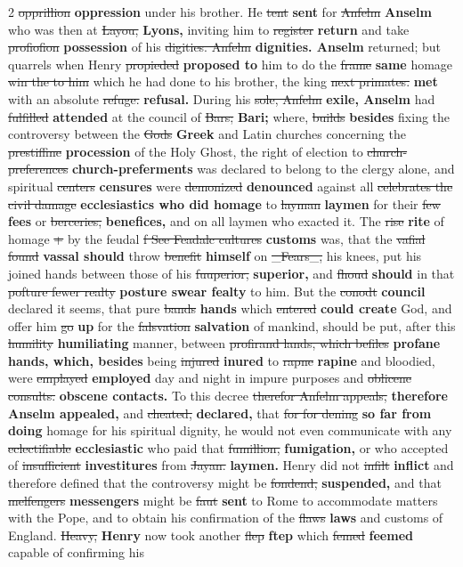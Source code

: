 \documentclass[10pt]{article}
\begin{document}
\begin{multicols}{2}
\sout{opprillion} \textbf{oppression} under his brother. He \sout{tent} \textbf{sent} for \sout{Anfelm} \textbf{Anselm} who was then at \sout{Layou,} \textbf{Lyons,} inviting him to \sout{register} \textbf{return} and take \sout{profiofion} \textbf{possession} of his \sout{digities. Anfelm} \textbf{dignities. Anselm} returned; but quarrels when Henry \sout{propieded} \textbf{proposed to} him to do the \sout{frame} \textbf{same} homage \sout{win the to him} which he had done to his brother, the king \sout{next primates.} \textbf{met} with an absolute \sout{refuge.} \textbf{refusal.} During his \sout{sole, Anfelm} \textbf{exile, Anselm} had \sout{fulfilled} \textbf{attended} at the council of \sout{Bars;} \textbf{Bari;} where, \sout{builds} \textbf{besides} fixing the controversy between the \sout{Gods} \textbf{Greek} and Latin churches concerning the \sout{prestiffine} \textbf{procession} of the Holy Ghost, the right of election to \sout{church-preferences} \textbf{church-preferments} was declared to belong to the clergy alone, and spiritual \sout{centers} \textbf{censures} were \sout{demonized} \textbf{denounced} against all \sout{celebrates the civil damage} \textbf{ecclesiastics who did homage} to \sout{layman} \textbf{laymen} for their \sout{few} \textbf{fees} or \sout{berceries,} \textbf{benefices,} and on all laymen who exacted it. The \sout{rise} \textbf{rite} of homage \sout{+} by the feudal \sout{f See Feadalc cultures} \textbf{customs} was, that the \sout{vafial found} \textbf{vassal should} throw \sout{benefit} \textbf{himself} on \sout{\_Fears\_,} his knees, put his joined hands between those of his \sout{fuuperior,} \textbf{superior,} and \sout{fhoud} \textbf{should} in that \sout{pofture fewer realty} \textbf{posture swear fealty} to him. But the \sout{conodt} \textbf{council} declared it seems, that pure \sout{bands} \textbf{hands} which \sout{entered} \textbf{could create} God, and offer him \sout{go} \textbf{up} for the \sout{falsvation} \textbf{salvation} of mankind, should be put, after this \sout{humility} \textbf{humiliating} manner, between \sout{profirand lands, which befiles} \textbf{profane hands, which, besides} being \sout{injured} \textbf{inured} to \sout{rapne} \textbf{rapine} and bloodied, were \sout{emplayed} \textbf{employed} day and night in impure purposes and \sout{oblicene consults.} \textbf{obscene contacts.} To this decree \sout{therefor Anfelm appeals,} \textbf{therefore Anselm appealed,} and \sout{cheated,} \textbf{declared,} that \sout{for for dening} \textbf{so far from doing} homage for his spiritual dignity, he would not even communicate with any \sout{eclectifiable} \textbf{ecclesiastic} who paid that \sout{fumillion,} \textbf{fumigation,} or who accepted of \sout{insufficient} \textbf{investitures} from \sout{Jayan.} \textbf{laymen.} Henry did not \sout{infilt} \textbf{inflict} and therefore defined that the controversy might be \sout{fondend,} \textbf{suspended,} and that \sout{melfengers} \textbf{messengers} might be \sout{faut} \textbf{sent} to Rome to accommodate matters with the Pope, and to obtain his confirmation of the \sout{flaws} \textbf{laws} and customs of England. \sout{Heavy,} \textbf{Henry} now took another \sout{flep} \textbf{ftep} which \sout{femed} \textbf{feemed} capable of confirming his 
\end{multicols}
\end{document}
